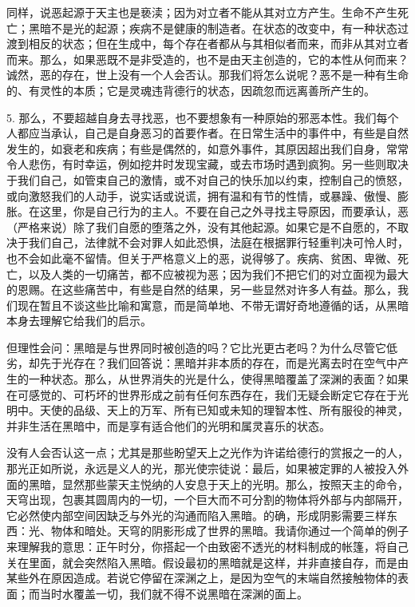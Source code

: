 同样，说恶起源于天主也是亵渎；因为对立者不能从其对立方产生。生命不产生死亡；黑暗不是光的起源；疾病不是健康的制造者。在状态的改变中，有一种状态过渡到相反的状态；但在生成中，每个存在者都从与其相似者而来，而非从其对立者而来。那么，如果恶既不是非受造的，也不是由天主创造的，它的本性从何而来？诚然，恶的存在，世上没有一个人会否认。那我们将怎么说呢？恶不是一种有生命的、有灵性的本质；它是灵魂违背德行的状态，因疏忽而远离善所产生的。\par

5. 那么，不要超越自身去寻找恶，也不要想象有一种原始的邪恶本性。我们每个人都应当承认，自己是自身恶习的首要作者。在日常生活中的事件中，有些是自然发生的，如衰老和疾病；有些是偶然的，如意外事件，其原因超出我们自身，常常令人悲伤，有时幸运，例如挖井时发现宝藏，或去市场时遇到疯狗。另一些则取决于我们自己，如管束自己的激情，或不对自己的快乐加以约束，控制自己的愤怒，或向激怒我们的人动手，说实话或说谎，拥有温和有节的性情，或暴躁、傲慢、膨胀。在这里，你是自己行为的主人。不要在自己之外寻找主导原因，而要承认，恶（严格来说）除了我们自愿的堕落之外，没有其他起源。如果它是不自愿的，不取决于我们自己，法律就不会对罪人如此恐惧，法庭在根据罪行轻重判决可怜人时，也不会如此毫不留情。但关于严格意义上的恶，说得够了。疾病、贫困、卑微、死亡，以及人类的一切痛苦，都不应被视为恶；因为我们不把它们的对立面视为最大的恩赐。在这些痛苦中，有些是自然的结果，另一些显然对许多人有益。那么，我们现在暂且不谈这些比喻和寓意，而是简单地、不带无谓好奇地遵循的话，从黑暗本身去理解它给我们的启示。\par

但理性会问：黑暗是与世界同时被创造的吗？它比光更古老吗？为什么尽管它低劣，却先于光存在？我们回答说：黑暗并非本质的存在，而是光离去时在空气中产生的一种状态。那么，从世界消失的光是什么，使得黑暗覆盖了深渊的表面？如果在可感觉的、可朽坏的世界形成之前有任何东西存在，我们无疑会断定它存在于光明中。天使的品级、天上的万军、所有已知或未知的理智本性、所有服役的神灵，并非生活在黑暗中，而是享有适合他们的光明和属灵喜乐的状态。\par

没有人会否认这一点；尤其是那些盼望天上之光作为许诺给德行的赏报之一的人，那光正如所说，永远是义人的光，那光使宗徒说：最后，如果被定罪的人被投入外面的黑暗，显然那些蒙天主悦纳的人安息于天上的光明。那么，按照天主的命令，天穹出现，包裹其圆周内的一切，一个巨大而不可分割的物体将外部与内部隔开，它必然使内部空间因缺乏与外光的沟通而陷入黑暗。的确，形成阴影需要三样东西：光、物体和暗处。天穹的阴影形成了世界的黑暗。我请你通过一个简单的例子来理解我的意思：正午时分，你搭起一个由致密不透光的材料制成的帐篷，将自己关在里面，就会突然陷入黑暗。假设最初的黑暗就是这样，并非直接自存，而是由某些外在原因造成。若说它停留在深渊之上，是因为空气的末端自然接触物体的表面；而当时水覆盖一切，我们就不得不说黑暗在深渊的面上。\par


